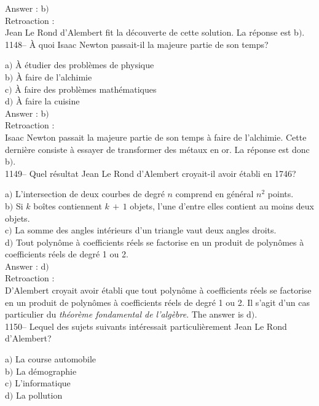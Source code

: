 ﻿\documentclass[letterpaper, 12pt]{article}
\begin{document}
Answer : b$)$\\

Retroaction : \\
Jean Le Rond d'Alembert fit la d\'ecouverte de cette solution. La r\'eponse
est b$)$.\\

1148-- \`A quoi Isaac Newton passait-il la majeure partie de son
temps?

a$)$ \`A \'etudier des probl\`emes de physique \\
b$)$ \`A faire de l'alchimie \\
c$)$ \`A faire des probl\`emes math\'ematiques \\
d$)$ \`A faire la cuisine  \\

Answer : b$)$\\

Retroaction : \\
Isaac Newton passait la majeure partie de son temps \`a faire de l'alchimie.
Cette derni\`ere consiste \`a essayer de transformer des m\'etaux en or. La
r\'eponse est donc b$)$.\\

1149-- Quel r\'esultat Jean Le Rond d'Alembert croyait-il avoir
\'etabli en 1746?

a$)$ L'intersection de deux courbes de degr\'e $n$ comprend en g\'en\'eral
$n^2$ points. \\
b$)$ Si $k$ bo\^ites contiennent $k\,+\,1$ objets, l'une d'entre elles
contient au moins deux objets. \\
c$)$ La somme des angles int\'erieurs d'un triangle vaut deux angles droits.
\\
d$)$ Tout polyn\^ome \`a coefficients r\'eels se factorise en un produit de
polyn\^omes \`a coefficients r\'eels de degr\'e 1 ou 2.\\

Answer : d$)$\\

Retroaction : \\
D'Alembert croyait avoir \'etabli que tout polyn\^ome \`a
coefficients r\'eels se factorise en un produit de polyn\^omes \`a
coefficients r\'eels de degr\'e 1 ou 2. Il s'agit d'un cas
particulier du {\sl th\'eor\`eme fondamental de l'alg\`ebre}.
The answer is d$)$.\\

1150-- Lequel des sujets suivants int\'eressait particuli\`erement
Jean Le Rond d'Alembert?

a$)$ La course automobile \\
b$)$ La d\'emographie \\
c$)$ L'informatique  \\
d$)$ La pollution \\
\end{document}
